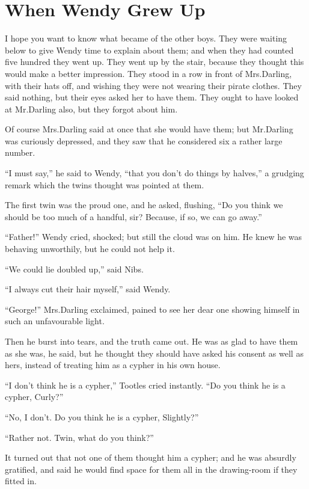 
\chapter{When Wendy Grew Up}

I hope you want to know what became of the other boys.
They were waiting below to give Wendy time to explain about them;
and when they had counted five hundred they went up.
They went up by the stair,
because they thought this would make a better impression.
They stood in a row in front of Mrs.\@ Darling, with their hats off,
and wishing they were not wearing their pirate clothes.
They said nothing, but their eyes asked her to have them.
They ought to have looked at Mr.\@ Darling also, but they forgot about him.

Of course Mrs.\@ Darling said at once that she would have them;
but Mr.\@ Darling was curiously depressed,
and they saw that he considered six a rather large number.

“I must say,” he said to Wendy, “that you don’t do things by halves,”
a grudging remark which the twins thought was pointed at them.

The first twin was the proud one, and he asked, flushing,
“Do you think we should be too much of a handful, sir?
Because, if so, we can go away.”

“Father!\@” Wendy cried, shocked;
but still the cloud was on him.
He knew he was behaving unworthily, but he could not help it.

“We could lie doubled up,” said Nibs.

“I always cut their hair myself,” said Wendy.

“George!\@” Mrs.\@ Darling exclaimed,
pained to see her dear one showing himself in such an unfavourable light.

Then he burst into tears, and the truth came out.
He was as glad to have them as she was, he said,
but he thought they should have asked his consent as well as hers, instead of treating him as a cypher in his own house.

“I don’t think he is a cypher,” Tootles cried instantly.
“Do you think he is a cypher, Curly?”

“No, I don’t.
Do you think he is a cypher, Slightly?”

“Rather not.
Twin, what do you think?”

It turned out that not one of them thought him a cypher;
and he was absurdly gratified,
and said he would find space for them all in the drawing-room if they fitted in.

